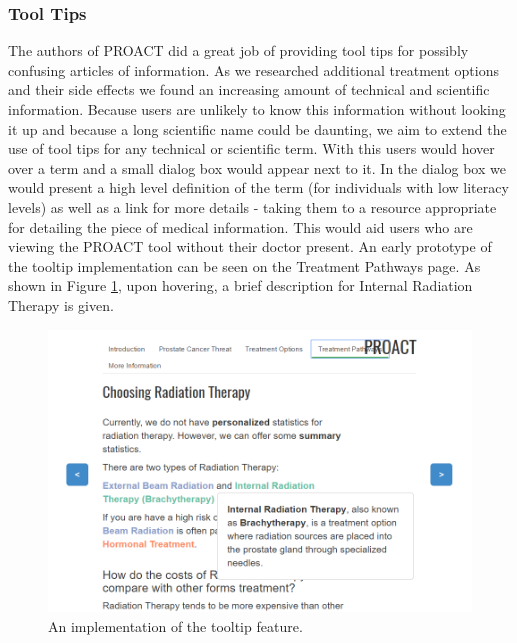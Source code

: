 \documentclass[journal]{vgtc}                %
\begin{document}
                \subsubsection{Tool Tips}
                        The authors of PROACT did a great job of providing tool tips for possibly confusing articles of information.
                        As we researched additional treatment options and their side effects we found an increasing amount of technical and scientific information.
                        Because users are unlikely to know this information without looking it up and because a long scientific name could be daunting, we aim to extend the use of tool tips for any technical or scientific term.
                        With this users would hover over a term and a small dialog box would appear next to it.
                        In the dialog box we would present a high level definition of the term (for individuals with low literacy levels) as well as a link for more details - taking them to a resource appropriate for detailing the piece of medical information.
                        This would aid users who are viewing the PROACT tool without their doctor present.
                        An early prototype of the tooltip implementation can be seen on the Treatment Pathways page. As shown in Figure \ref{fig:tool}, upon hovering, a brief description for Internal Radiation Therapy is given.
                        \begin{figure}[!ht]
                            \includegraphics[width=\columnwidth]{tooltip.png}
                            \caption{An implementation of the tooltip feature.}
                            \label{fig:tool}
                        \end{figure}
\end{document}
